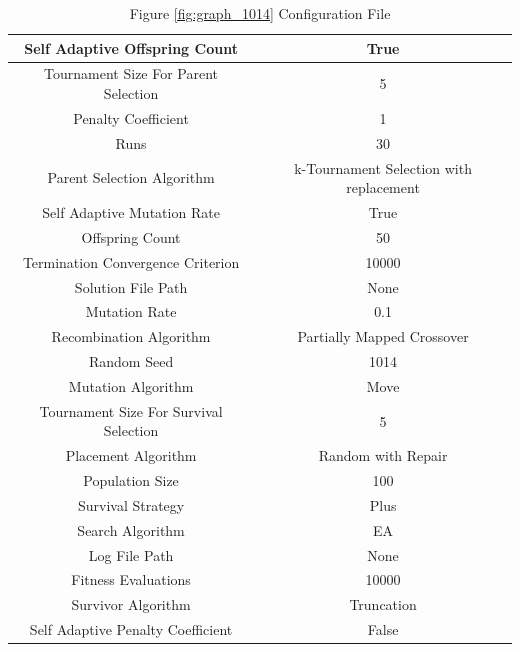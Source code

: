 \documentclass{standalone}
\begin{document}
\begin{table}[!htb]
	\centering
	\caption{Figure \ref{fig:graph_1014} Configuration File}
	\label{tab:graph_1014}
	\begin{tabular}{| c | c |}
		\hline
		Self Adaptive Offspring Count		& True		 \\
		\hline
		Tournament Size For Parent Selection		& 5		 \\
		\hline
		Penalty Coefficient		& 1		 \\
		\hline
		Runs		& 30		 \\
		\hline
		Parent Selection Algorithm		& k-Tournament Selection with replacement		 \\
		\hline
		Self Adaptive Mutation Rate		& True		 \\
		\hline
		Offspring Count		& 50		 \\
		\hline
		Termination Convergence Criterion		& 10000		 \\
		\hline
		Solution File Path		& None		 \\
		\hline
		Mutation Rate		& 0.1		 \\
		\hline
		Recombination Algorithm		& Partially Mapped Crossover		 \\
		\hline
		Random Seed		& 1014		 \\
		\hline
		Mutation Algorithm		& Move		 \\
		\hline
		Tournament Size For Survival Selection		& 5		 \\
		\hline
		Placement Algorithm		& Random with Repair		 \\
		\hline
		Population Size		& 100		 \\
		\hline
		Survival Strategy		& Plus		 \\
		\hline
		Search Algorithm		& EA		 \\
		\hline
		Log File Path		& None		 \\
		\hline
		Fitness Evaluations		& 10000		 \\
		\hline
		Survivor Algorithm		& Truncation		 \\
		\hline
		Self Adaptive Penalty Coefficient		& False		 \\
		\hline
	\end{tabular}
\end{table}
\end{document}
